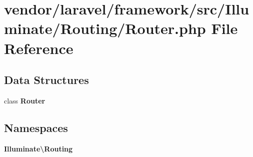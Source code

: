 \section{vendor/laravel/framework/src/\+Illuminate/\+Routing/\+Router.php File Reference}
\label{laravel_2framework_2src_2_illuminate_2_routing_2_router_8php}
\subsection*{Data Structures}
\begin{DoxyCompactItemize}
\item 
class {\bf Router}
\end{DoxyCompactItemize}
\subsection*{Namespaces}
\begin{DoxyCompactItemize}
\item 
 {\bf Illuminate\textbackslash{}\+Routing}
\end{DoxyCompactItemize}
